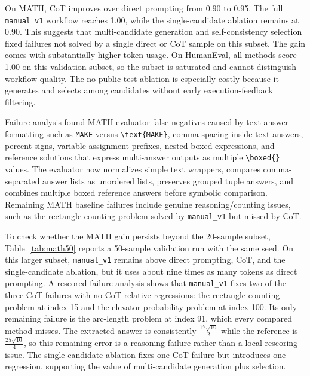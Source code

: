 \documentclass{article}
\begin{document}
On MATH, CoT improves over direct prompting from 0.90 to 0.95. The full \texttt{manual\_v1} workflow reaches 1.00, while the single-candidate ablation remains at 0.90. This suggests that multi-candidate generation and self-consistency selection fixed failures not solved by a single direct or CoT sample on this subset. The gain comes with substantially higher token usage. On HumanEval, all methods score 1.00 on this validation subset, so the subset is saturated and cannot distinguish workflow quality. The no-public-test ablation is especially costly because it generates and selects among candidates without early execution-feedback filtering.

Failure analysis found MATH evaluator false negatives caused by text-answer formatting such as \texttt{MAKE} versus \texttt{\textbackslash text\{MAKE\}}, comma spacing inside text answers, percent signs, variable-assignment prefixes, nested boxed expressions, and reference solutions that express multi-answer outputs as multiple \texttt{\textbackslash boxed\{\}} values. The evaluator now normalizes simple text wrappers, compares comma-separated answer lists as unordered lists, preserves grouped tuple answers, and combines multiple boxed reference answers before symbolic comparison. Remaining MATH baseline failures include genuine reasoning/counting issues, such as the rectangle-counting problem solved by \texttt{manual\_v1} but missed by CoT.

To check whether the MATH gain persists beyond the 20-sample subset, Table~\ref{tab:math50} reports a 50-sample validation run with the same seed. On this larger subset, \texttt{manual\_v1} remains above direct prompting, CoT, and the single-candidate ablation, but it uses about nine times as many tokens as direct prompting. A rescored failure analysis shows that \texttt{manual\_v1} fixes two of the three CoT failures with no CoT-relative regressions: the rectangle-counting problem at index 15 and the elevator probability problem at index 100. Its only remaining failure is the arc-length problem at index 91, which every compared method misses. The extracted answer is consistently \(\frac{17\sqrt{10}}{2}\) while the reference is \(\frac{25\sqrt{10}}{4}\), so this remaining error is a reasoning failure rather than a local rescoring issue. The single-candidate ablation fixes one CoT failure but introduces one regression, supporting the value of multi-candidate generation plus selection.
\end{document}
